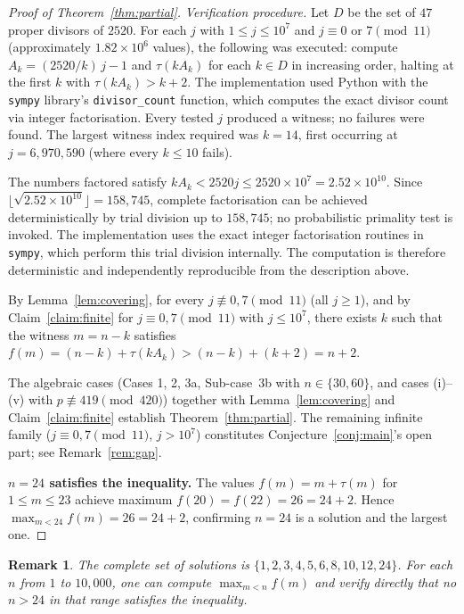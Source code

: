 \documentclass[11pt]{article}
\newtheorem{remark}{Remark}
\begin{document}
\begin{proof}[Proof of Theorem~\ref{thm:partial}]
\noindent\textit{Verification procedure.}
Let $D$ be the set of $47$ proper divisors of $2520$.
For each $j$ with $1 \le j \le 10^7$ and $j \equiv 0$ or $7 \pmod{11}$
(approximately $1.82 \times 10^6$ values), the following was executed:
compute $A_k = (2520/k)\,j - 1$ and $\tau(k A_k)$ for each $k \in D$
in increasing order, halting at the first $k$ with $\tau(k A_k) > k + 2$.
The implementation used Python with the \texttt{sympy} library's
\texttt{divisor\_count} function, which computes the exact divisor count
via integer factorisation.  Every tested $j$ produced a witness;
no failures were found.  The largest witness index required was $k = 14$,
first occurring at $j = 6{,}970{,}590$ (where every $k \le 10$ fails).

The numbers factored satisfy $kA_k < 2520j \le 2520 \times 10^7 = 2.52 \times 10^{10}$.
Since $\lfloor\sqrt{2.52 \times 10^{10}}\rfloor = 158{,}745$, complete factorisation
can be achieved deterministically by trial division up to $158{,}745$; no probabilistic
primality test is invoked.  The implementation uses the exact integer factorisation
routines in \texttt{sympy}, which perform this trial division internally.
The computation is therefore deterministic and independently reproducible from
the description above.

\noindent By Lemma~\ref{lem:covering}, for every $j \not\equiv 0, 7 \pmod{11}$ (all $j \ge 1$),
and by Claim~\ref{claim:finite} for $j \equiv 0, 7 \pmod{11}$ with $j \le 10^7$,
there exists $k$ such that the witness $m = n - k$ satisfies
$f(m) = (n-k) + \tau(kA_k) > (n-k) + (k+2) = n+2$.

\bigskip
The algebraic cases (Cases 1, 2, 3a, Sub-case~3b with $n \in \{30, 60\}$, and
cases (i)--(v) with $p \not\equiv 419 \pmod{420}$) together with
Lemma~\ref{lem:covering} and Claim~\ref{claim:finite} establish
Theorem~\ref{thm:partial}.  The remaining infinite family
($j \equiv 0,7 \pmod{11}$, $j > 10^7$) constitutes Conjecture~\ref{conj:main}'s
open part; see Remark~\ref{rem:gap}.

\bigskip
\noindent\textbf{$n = 24$ satisfies the inequality.}
The values $f(m) = m + \tau(m)$ for $1 \le m \le 23$ achieve maximum $f(20) = f(22) = 26 = 24 + 2$.
Hence $\max_{m < 24} f(m) = 26 = 24 + 2$, confirming $n = 24$ is a solution and the
largest one.
\end{proof}

\begin{remark}
The complete set of solutions is $\{1, 2, 3, 4, 5, 6, 8, 10, 12, 24\}$.
For each $n$ from $1$ to $10{,}000$, one can compute $\max_{m<n} f(m)$ and verify
directly that no $n > 24$ in that range satisfies the inequality.
\end{remark}
\end{document}
